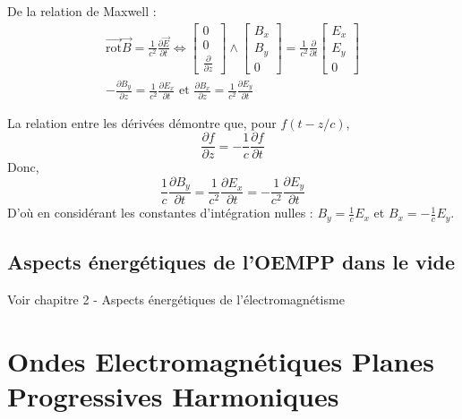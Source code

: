 \begin{myproof}
De la relation de Maxwell : 
\begin{gather*}
    \overrightarrow{\mathrm{rot}} \overrightarrow{B}  = \frac{1}{c^{2}} \frac{\partial \overrightarrow{E} }{\partial t} \iff \begin{bmatrix}
      0 \\ 0 \\ \frac{\partial }{\partial z} 
    \end{bmatrix}
    \wedge 
    \begin{bmatrix}
      B_x \\ B_y \\ 0
    \end{bmatrix}
    = 
    \frac{1}{c ^2} \frac{\partial }{\partial t} \begin{bmatrix}
      E_x \\E_y\\0
    \end{bmatrix} \\
    - \frac{\partial B_y}{\partial z}  = \frac{1}{c^{2}}  \frac{\partial E_x}{\partial t}  \text{ et } \frac{\partial B_x}{\partial z}  = \frac{1}{c^{2}}  \frac{\partial E_y}{\partial t}
\end{gather*}

La relation entre les dérivées démontre que, pour $f(t-z/c)$, 
\[
  \frac{\partial f}{\partial z } = - \frac{1}{c} \frac{\partial f }{\partial t}  
\]
Donc, 
\[
    \frac{1}{c} \frac{\partial B_y}{\partial t} = \frac{1}{c^{2}} \frac{\partial E_x}{\partial t} = - \frac{1}{c^{2}} \frac{\partial E_y}{\partial t}
\]
D'où en considérant les constantes d'intégration nulles : $B_y = \frac{1}{c} E_x$ et $B_x = -\frac{1}{c} E_y$.
\end{myproof}

\subsection{Aspects énergétiques de l'OEMPP dans le vide}
Voir chapitre 2 - Aspects énergétiques de l'électromagnétisme

\newpage
\section{Ondes Electromagnétiques Planes Progressives Harmoniques}

